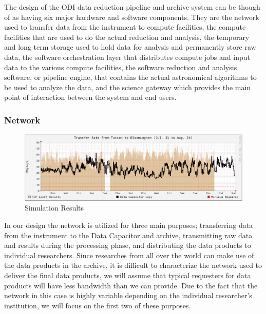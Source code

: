 \documentclass[10pt,conference]{IEEEtran}
\begin{document}
The design of the ODI data reduction pipeline and archive system can be though of as having six major hardware and software components. They are the network used to transfer data from the instrument to compute facilities, the compute facilities that are used to do the actual reduction and analysis, the temporary and long term storage used to hold data for analysis and permanently store raw data, the software orchestration layer that distributes compute jobs and input data to the various compute facilities, the software reduction and analysis software, or pipeline engine, that contains the actual astronomical algorithms to be used to analyze the data, and the science gateway which provides the main point of interaction between the system and end users. 

\subsubsection{Network}\label{sec:network}
\begin{figure}[t]
\centering
\includegraphics[width=6in]{network_throughput.eps}
\caption{Simulation Results}
\label{fig:network}
\end{figure}

In our design the network is utilized for three main purposes; transferring data from the instrument to the Data Capacitor and archive, transmitting raw data and results during the processing phase, and distributing the data products to individual researchers. Since researches from all over the world can make use of the data products in the archive, it is difficult to characterize the network used to deliver the final data products, we will assume that typical requesters for data products will have less bandwidth than we can provide. Due to the fact that the network in this case is highly variable depending on the individual researcher's institution, we will focus on the first two of these purposes. 
\end{document}
